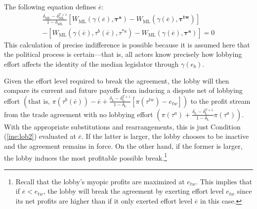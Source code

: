 \documentclass[authoryear, review]{elsarticle}
\newcommand{\ov}{\overline}
\newcommand{\bta}{\bm{\tau^a}}
\newcommand{\ga}{\gamma}
\newcommand{\btw}{\bm{\tau^{tw}}}
\newcommand{\de}{\delta}
\begin{document}
The following equation defines $\ov{e}$:
\begin{multline}
  \frac{\de_\text{ML} - \de_\text{ML}^{T+1}}{1-\de_\text{ML}} \left[W_\text{ML}(\ga(\ov{e}),\bta) - W_\text{ML}(\ga(\ov{e}),\btw) \right] \\
	- \left[ W_\text{ML}(\ga(\ov{e}),\tau^b(\ov{e}),\tau^{*a}) - W_\text{ML}(\ga(\ov{e}),\bta) \right] = 0
  \label{eq:leg2}
\end{multline}
This calculation of precise indifference is possible because it is assumed here that the political process is certain---that is, all actors know precisely how lobbying effort affects the identity of the median legislator through $\ga(e_b)$.

Given the effort level required to break the agreement, the lobby will then compare its current and future payoffs from inducing a dispute net of lobbying effort $\left(\text{that is, }\pi(\tau^b(\ov{e})) - \ov{e} + \frac{\de_\text{L} - \de_\text{L}^{T+1}}{1-\de_\text{L}} \left[\pi(\tau^{tw}) -e_{tw}\right] \right)$ to the profit stream from the trade agreement with no lobbying effort $\left(\pi(\tau^a) + \frac{\de_\text{L} - \de_\text{L}^{T+1}}{1-\de_\text{L}} \pi(\tau^a) \right)$. With the appropriate substitutions and rearrangements, this is just Condition (\ref{ine:lob2}) evaluated at $\ov{e}$. If the latter is larger, the lobby chooses to be inactive and the agreement remains in force. On the other hand, if the former is larger, the lobby induces the most profitable possible break.\footnote{Recall that the lobby's myopic profits are maximized at $e_{tw}$. This implies that if $\ov{e} < e_{tw}$, the lobby will break the agreement by exerting effort level $e_{tw}$ since its net profits are higher than if it only exerted effort level $\ov{e}$ in this case.} 
\end{document}
